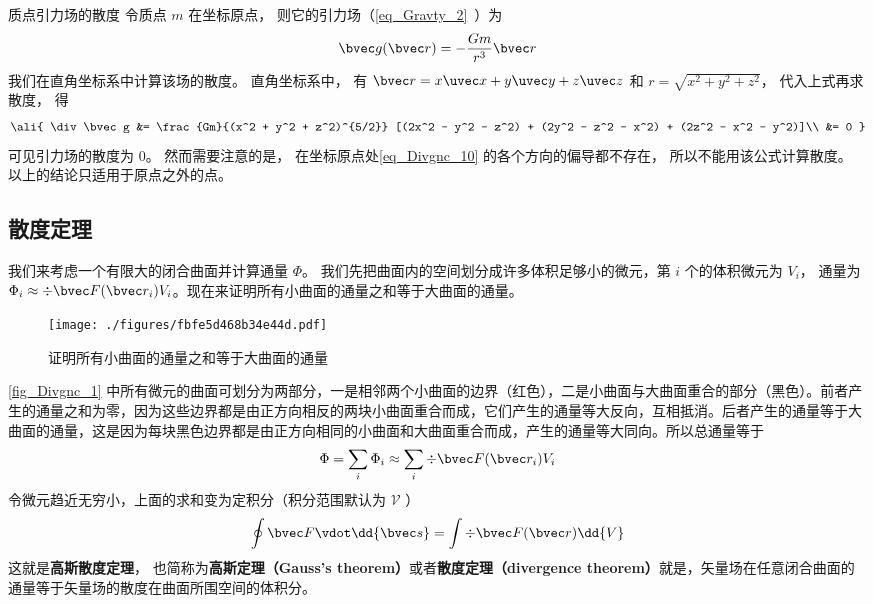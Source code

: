 \begin{example}{质点引力场的散度}
令质点 $m$ 在坐标原点， 则它的引力场（\autoref{eq_Gravty_2}~）为
\begin{equation}\label{eq_Divgnc_10}
\bvec g(\bvec r) = -\frac{Gm}{r^3}\bvec r
\end{equation}
我们在直角坐标系中计算该场的散度。 直角坐标系中， 有 $\bvec r = x\uvec x + y\uvec y + z\uvec z$ 和 $r = \sqrt{x^2 + y^2 + z^2}$， 代入上式再求散度， 得
\begin{equation}\ali{
\div \bvec g &= \frac{Gm}{(x^2 + y^2 + z^2)^{5/2}} [(2x^2 - y^2 - z^2) + (2y^2 - z^2 - x^2) + (2z^2 - x^2 - y^2)]\\
&= 0
}\end{equation}
可见引力场的散度为 0。 然而需要注意的是， 在坐标原点处\autoref{eq_Divgnc_10} 的各个方向的偏导都不存在， 所以不能用该公式计算散度。 以上的结论只适用于原点之外的点。
\end{example}


\subsection{散度定理}

我们来考虑一个有限大的闭合曲面并计算通量 $\Phi$。 我们先把曲面内的空间划分成许多体积足够小的微元，第 $i$ 个的体积微元为 $V_i$， 通量为 $\Phi_i \approx \div \bvec F(\bvec r_i) V_i$。现在来证明所有小曲面的通量之和等于大曲面的通量。
\begin{figure}[ht]
\centering
\texttt{[image: ./figures/fbfe5d468b34e44d.pdf]}
\caption{证明所有小曲面的通量之和等于大曲面的通量} \label{fig_Divgnc_1}
\end{figure}
\autoref{fig_Divgnc_1} 中所有微元的曲面可划分为两部分，一是相邻两个小曲面的边界（红色），二是小曲面与大曲面重合的部分（黑色）。前者产生的通量之和为零，因为这些边界都是由正方向相反的两块小曲面重合而成，它们产生的通量等大反向，互相抵消。后者产生的通量等于大曲面的通量，这是因为每块黑色边界都是由正方向相同的小曲面和大曲面重合而成，产生的通量等大同向。所以总通量等于
\begin{equation}
\Phi  = \sum_i \Phi_i  \approx \sum_i \div \bvec F (\bvec r_i) V_i
\end{equation}
令微元趋近无穷小，上面的求和变为定积分（积分范围默认为 $\mathcal V$ ）
\begin{equation}\label{eq_Divgnc_13}
\oint \bvec F \vdot \dd{\bvec s} = \int \div \bvec F(\bvec r) \dd{V}
\end{equation}
这就是\textbf{高斯散度定理}， 也简称为\textbf{高斯定理（Gauss's theorem）}或者\textbf{散度定理（divergence theorem）}就是，矢量场在任意闭合曲面的通量等于矢量场的散度在曲面所围空间的体积分。

